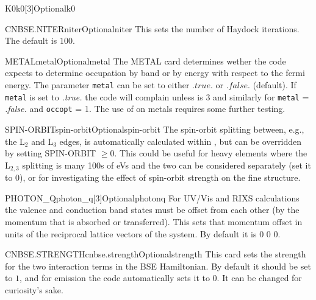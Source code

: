 \documentclass[11pt]{report}
\begin{document}
\begin{Card}{K0}{k0[3]}{Optional}{k0}
\begin{Card}{CNBSE.NITER}{niter}{Optional}{niter}
This sets the number of Haydock iterations. The default is $100$.
\end{Card}

\begin{Card}{METAL}{metal}{Optional}{metal}
The METAL card determines wether the code expects to determine occupation by band or by energy with respect to the fermi energy. The parameter \texttt{metal} can be set to either $.true.$ or $.false.$ (default). If \texttt{metal} is set to {\it .true.} the code will complain unless  is 3 and similarly for \texttt{metal} = {\it .false.} and \texttt{occopt} = 1. The use of  on metals requires some further testing. 
\end{Card}


\begin{Card}{SPIN-ORBIT}{spin-orbit}{Optional}{spin-orbit}
The spin-orbit splitting between, e.g., the L$_2$ and L$_3$ edges, is automatically calculated within , but can be overridden by setting SPIN-ORBIT $ \ge 0$. 
This could be useful for heavy elements where the L$_{2,3}$ splitting is many 100s of eVs and the two can be considered separately (set it to 0), or for investigating the effect of spin-orbit strength on the fine structure.
\end{Card}

\begin{Card}{PHOTON\_Q}{photon\_q[3]}{Optional}{photonq}
For UV/Vis and RIXS calculations the valence and conduction band states must be offset from each other (by the momentum that is absorbed or transferred). 
This sets that momentum offset in units of the reciprocal lattice vectors of the system.
By default it is 0 0 0.
\end{Card}

\begin{Card}{CNBSE.STRENGTH}{cnbse.strength}{Optional}{strength}
This card sets the strength for the two interaction terms in the BSE Hamiltonian. By default it should be set to $1$, and for emission the code automatically sets it to $0$. 
It can be changed for curiosity's sake.
\end{Card}


\end{Card}
\end{document}
